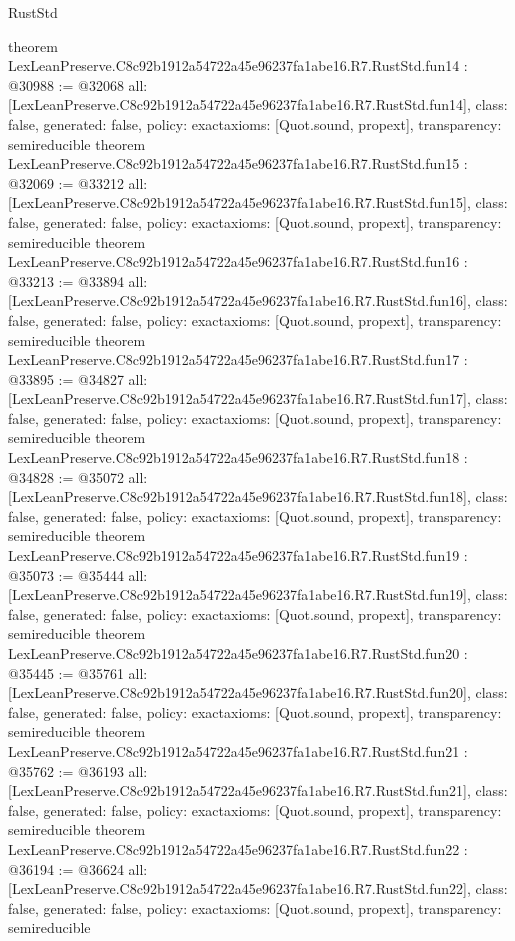 \begin{lexlean}{RustStd}
\begin{coremodule}
{}
theorem LexLeanPreserve.C8c92b1912a54722a45e96237fa1abe16.R7.RustStd.fun14 : @30988 := @32068 {
  all: [LexLeanPreserve.C8c92b1912a54722a45e96237fa1abe16.R7.RustStd.fun14],
  class: false,
  generated: false,
  policy: exact{axioms: [Quot.sound, propext]},
  transparency: semireducible
}
theorem LexLeanPreserve.C8c92b1912a54722a45e96237fa1abe16.R7.RustStd.fun15 : @32069 := @33212 {
  all: [LexLeanPreserve.C8c92b1912a54722a45e96237fa1abe16.R7.RustStd.fun15],
  class: false,
  generated: false,
  policy: exact{axioms: [Quot.sound, propext]},
  transparency: semireducible
}
theorem LexLeanPreserve.C8c92b1912a54722a45e96237fa1abe16.R7.RustStd.fun16 : @33213 := @33894 {
  all: [LexLeanPreserve.C8c92b1912a54722a45e96237fa1abe16.R7.RustStd.fun16],
  class: false,
  generated: false,
  policy: exact{axioms: [Quot.sound, propext]},
  transparency: semireducible
}
theorem LexLeanPreserve.C8c92b1912a54722a45e96237fa1abe16.R7.RustStd.fun17 : @33895 := @34827 {
  all: [LexLeanPreserve.C8c92b1912a54722a45e96237fa1abe16.R7.RustStd.fun17],
  class: false,
  generated: false,
  policy: exact{axioms: [Quot.sound, propext]},
  transparency: semireducible
}
theorem LexLeanPreserve.C8c92b1912a54722a45e96237fa1abe16.R7.RustStd.fun18 : @34828 := @35072 {
  all: [LexLeanPreserve.C8c92b1912a54722a45e96237fa1abe16.R7.RustStd.fun18],
  class: false,
  generated: false,
  policy: exact{axioms: [Quot.sound, propext]},
  transparency: semireducible
}
theorem LexLeanPreserve.C8c92b1912a54722a45e96237fa1abe16.R7.RustStd.fun19 : @35073 := @35444 {
  all: [LexLeanPreserve.C8c92b1912a54722a45e96237fa1abe16.R7.RustStd.fun19],
  class: false,
  generated: false,
  policy: exact{axioms: [Quot.sound, propext]},
  transparency: semireducible
}
theorem LexLeanPreserve.C8c92b1912a54722a45e96237fa1abe16.R7.RustStd.fun20 : @35445 := @35761 {
  all: [LexLeanPreserve.C8c92b1912a54722a45e96237fa1abe16.R7.RustStd.fun20],
  class: false,
  generated: false,
  policy: exact{axioms: [Quot.sound, propext]},
  transparency: semireducible
}
theorem LexLeanPreserve.C8c92b1912a54722a45e96237fa1abe16.R7.RustStd.fun21 : @35762 := @36193 {
  all: [LexLeanPreserve.C8c92b1912a54722a45e96237fa1abe16.R7.RustStd.fun21],
  class: false,
  generated: false,
  policy: exact{axioms: [Quot.sound, propext]},
  transparency: semireducible
}
theorem LexLeanPreserve.C8c92b1912a54722a45e96237fa1abe16.R7.RustStd.fun22 : @36194 := @36624 {
  all: [LexLeanPreserve.C8c92b1912a54722a45e96237fa1abe16.R7.RustStd.fun22],
  class: false,
  generated: false,
  policy: exact{axioms: [Quot.sound, propext]},
  transparency: semireducible
}
\end{coremodule}
\end{lexlean}
